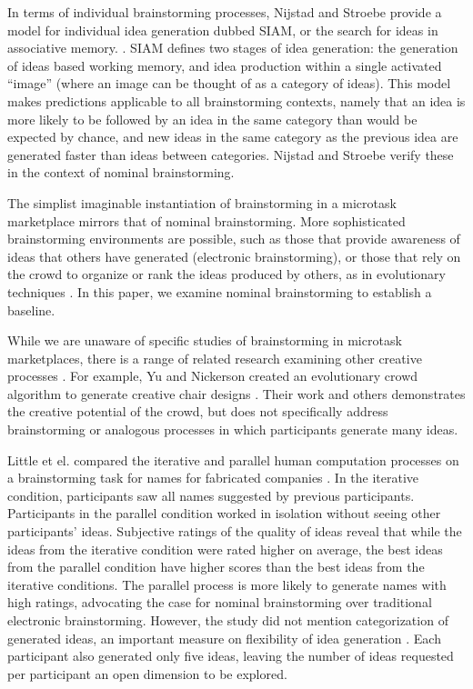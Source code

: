 In terms of individual brainstorming processes, Nijstad and Stroebe provide a model for individual idea generation dubbed SIAM, or the search for ideas in associative memory. \cite{nijstad_how_2006}. SIAM defines two stages of idea generation: the generation of ideas based working memory, and idea production within a single activated ``image'' (where an image can be thought of as a category of ideas). This model makes predictions applicable to all brainstorming contexts, namely that an idea is more likely to be followed by an idea in the same category than would be expected by chance, and new ideas in the same category as the previous idea are generated faster than ideas between categories. Nijstad and Stroebe verify these in the context of nominal brainstorming.

The simplist imaginable instantiation of brainstorming in a microtask marketplace mirrors that of nominal brainstorming. More sophisticated brainstorming environments are possible, such as those that provide awareness of ideas that others have generated (electronic brainstorming), or those that rely on the crowd to organize or rank the ideas produced by others, as in evolutionary techniques \cite{yu_cooks_2011}.
In this paper, we examine nominal brainstorming to establish a baseline.

While we are unaware of specific studies of brainstorming in microtask marketplaces, there is a range of related research examining other creative processes \cite{lewis2011affective, kittur2011crowdforge, Zhang:2012:HCT:2207676.2207708}. For example, Yu and Nickerson created an evolutionary crowd algorithm to generate creative chair designs \cite{yu_cooks_2011}. Their work and others demonstrates the creative potential of the crowd, but does not specifically address brainstorming or analogous processes in which participants generate many ideas. 

Little et el. compared the iterative and parallel human computation processes on a brainstorming task for names for fabricated companies \cite{little2010exploring}. In the iterative condition, participants saw all names suggested by previous participants. Participants in the parallel condition worked in isolation without seeing other participants' ideas. Subjective ratings of the quality of ideas reveal that while the ideas from the iterative condition were rated higher on average, the best ideas from the parallel condition have higher scores than the best ideas from the iterative conditions. The parallel process is more likely to generate names with high ratings, advocating the case for nominal brainstorming over traditional electronic brainstorming. However, the study did not mention categorization of generated ideas, an important measure on flexibility of idea generation \cite{lewis2011affective, nijstad_how_2006, finke1992creative, shah2003metrics}. Each participant also generated only five ideas, leaving the number of ideas requested per participant an open dimension to be explored.

